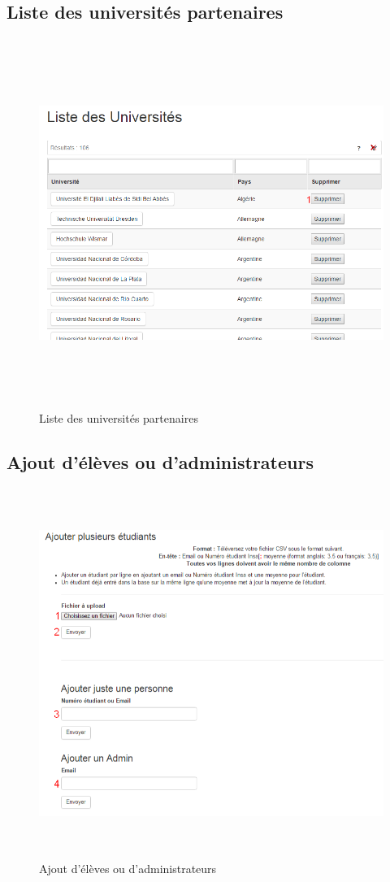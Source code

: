     \subsection{Liste des universités partenaires}
    \begin{figure}[H]
    	\centering
    	
    	\includegraphics[width=16cm,height=12cm]{Images/Super_Admin/liste_univ_super_admin}
    	\caption{Liste des universités partenaires}
    	\label{lusa}
    \end{figure}
 
  \subsection{Ajout d'élèves ou d'administrateurs}
  \begin{figure}[H]
  	\centering
  	
  	\includegraphics[width=16cm,height=12cm]{Images/Super_Admin/ajout_gens_super_admin}
  	\caption{Ajout d'élèves ou d'administrateurs}
  	\label{agsa}
  \end{figure}
    